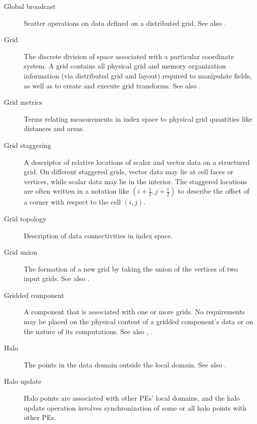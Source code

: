 \begin{description}
\item[Global broadcast] \label{glos:GlobBroadcast}
  Scatter operations on data defined on a distributed grid.
  See also .

\item[Grid] \label{glos:Grid} The discrete division of space associated with
  a particular coordinate system.  A grid contains all physical grid and memory 
  organization information (via distributed grid and layout) required to manipulate 
  fields, as well as to create and execute grid transforms. 
  See also . 

\item[Grid metrics] \label{glos:GridMetrics} Terms relating measurements 
  in index space to physical grid quantities like distances and areas.

\item[Grid staggering] \label{glos:GridStagger} 
  A descriptor of relative locations
  of scalar and vector data on a structured grid. On different
  staggered grids, vector data may lie at cell faces or vertices,
  while scalar data may lie in the interior. The staggered locations
  are often written in a notation like $(i+\frac12,j+\frac12)$ to
  describe the offset of a corner with respect to the cell $(i,j)$.

\item[Grid topology] \label{glos:GridTopo} Description of data 
  connectivities in index space.

\item[Grid union] \label{glos:GridUnion} The formation of a new grid
  by taking the union of the vertices of two input grids.
  See also . 

\item[Gridded component] \label{glos:GridComp}
  A component that is associated with one or more grids.  No requirements 
  may be placed on the physical content of a gridded component's data or 
  on the nature of its computations. See also 
  , . 

\item[Halo] \label{glos:Halo} 
  The points in the data domain outside the local domain. 
  See also . %

\item[Halo update] \label{glos:HaloUpdate}
  Halo points are associated with other PEs'
  local domains, and the halo update operation involves
  synchronization of some or all halo points with other PEs. 


\end{description}
